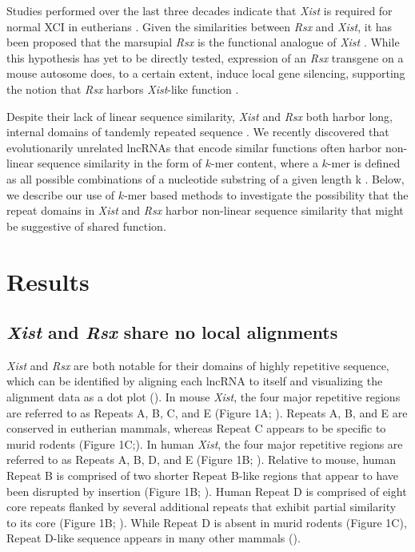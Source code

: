 Studies performed over the last three decades indicate that \textit{\emph{Xist}} is required for normal XCI in eutherians \cite{Balaton2018TheChromosome,Brockdorff2018LocalNcRNA,DaRocha2017NovelConformation,Sahakyan2018TheCompensation}. Given the similarities between \emph{Rsx} and \emph{Xist}, it has been proposed that the marsupial \emph{Rsx} is the functional analogue of \emph{Xist} \cite{Grant2012RsxInactivation}. While this hypothesis has yet to be directly tested, expression of an \emph{Rsx} transgene on a mouse autosome does, to a certain extent, induce local gene silencing, supporting the notion that \emph{Rsx} harbors \emph{Xist}-like function \cite{Grant2012RsxInactivation}.

Despite their lack of linear sequence similarity, \emph{Xist} and \emph{Rsx} both harbor long, internal domains of tandemly repeated sequence \cite{Grant2012RsxInactivation,Johnson2018AdaptationGenome}. We recently discovered that evolutionarily unrelated lncRNAs that encode similar functions often harbor non-linear sequence similarity in the form of $k$-mer content, where a $k$-mer is defined as all possible combinations of a nucleotide substring of a given length k \cite{Kirk2018FunctionalContent}. Below, we describe our use of $k$-mer based methods to investigate the possibility that the repeat domains in \emph{Xist} and \emph{Rsx} harbor non-linear sequence similarity that might be suggestive of shared function.

\section{Results}
\subsection{\emph{Xist} and \emph{Rsx} share no local alignments}
\emph{Xist} and \emph{Rsx} are both notable for their domains of highly repetitive sequence, which can be identified by aligning each lncRNA to itself and visualizing the alignment data as a dot plot (\cite{Rice2000EMBOSS:Suite}). In mouse \emph{Xist}, the four major repetitive regions are referred to as Repeats A, B, C, and E (Figure 1A; \cite{Brockdorff10TheNucleus.}). Repeats A, B, and E are conserved in eutherian mammals, whereas Repeat C appears to be specific to murid rodents (Figure 1C;\cite{Nesterova2001CharacterizationSequence,Yen2007AEutheria}). In human \emph{Xist}, the four major repetitive regions are referred to as Repeats A, B, D, and E (Figure 1B; \cite{Brown10TheNucleus.}). Relative to mouse, human Repeat B is comprised of two shorter Repeat B-like regions that appear to have been disrupted by insertion (Figure 1B; \cite{Nesterova2001CharacterizationSequence,Yen2007AEutheria}). Human Repeat D is comprised of eight core repeats flanked by several additional repeats that exhibit partial similarity to its core (Figure 1B; \cite{Brown10TheNucleus.,Nesterova2001CharacterizationSequence,Yen2007AEutheria}). While Repeat D is absent in murid rodents (Figure 1C), Repeat D-like sequence appears in many other mammals (\cite{Nesterova2001CharacterizationSequence,Yen2007AEutheria}).

